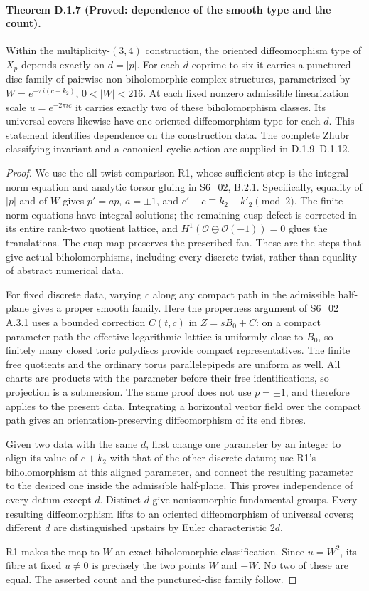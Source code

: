 \paragraph{Theorem D.1.7 (Proved: dependence of the smooth type and the count).}
Within the multiplicity-$(3,4)$ construction, the oriented
diffeomorphism type of $X_p$ depends exactly on $d=|p|$.
For each $d$ coprime to six it carries a punctured-disc family of
pairwise non-biholomorphic complex structures, parametrized by
$W=e^{-\pi i(c+k_2)}$, $0<|W|<216$. At each fixed nonzero admissible
linearization scale $u=e^{-2\pi ic}$ it carries exactly two of these
biholomorphism classes. Its universal covers likewise have one
oriented diffeomorphism type for each $d$. This statement identifies
dependence on the construction data. The complete Zhubr classifying
invariant and a canonical cyclic action are supplied in D.1.9--D.1.12.
\begin{proof}
We use the all-twist comparison R1, whose sufficient step is the
integral norm equation and analytic torsor gluing in S6\_02,
B.2.1. Specifically, equality of $|p|$ and of $W$ gives
$p'=ap$, $a=\pm1$, and $c'-c\equiv k_2-k'_2\pmod2$.
The finite norm equations have integral solutions; the remaining
cusp defect is corrected in its entire rank-two quotient lattice,
and $H^1(\mathcal O\oplus\mathcal O(-1))=0$ glues the translations.
The cusp map preserves the prescribed fan. These are the steps that
give actual biholomorphisms, including every discrete twist, rather
than equality of abstract numerical data.

For fixed discrete data, varying $c$ along any compact path in the
admissible half-plane gives a proper smooth family. Here the
properness argument of S6\_02 A.3.1 uses a bounded correction
$C(t,c)$ in $Z=sB_0+C$: on a compact parameter path the effective
logarithmic lattice is uniformly close to $B_0$, so finitely many
closed toric polydiscs provide compact representatives. The finite
free quotients and the ordinary torus parallelepipeds are uniform
as well. All charts are products with the parameter before their
free identifications, so projection is a submersion. The same proof
does not use $p=\pm1$, and therefore applies to the present data.
Integrating a horizontal vector field over the compact path gives
an orientation-preserving diffeomorphism of its end fibres.

Given two data with the same $d$, first change one parameter by an
integer to align its value of $c+k_2$ with that of the other
discrete datum; use R1's biholomorphism at this aligned parameter,
and connect the resulting parameter to the desired one inside the
admissible half-plane. This proves independence of every datum
except $d$. Distinct $d$ give nonisomorphic fundamental groups.
Every resulting diffeomorphism lifts to an oriented diffeomorphism
of universal covers; different $d$ are distinguished upstairs by
Euler characteristic $2d$.

R1 makes the map to $W$ an exact biholomorphic classification.
Since $u=W^2$, its fibre at fixed $u\ne0$ is precisely the two
points $W$ and $-W$. No two of these are equal. The asserted count
and the punctured-disc family follow.
\end{proof}
